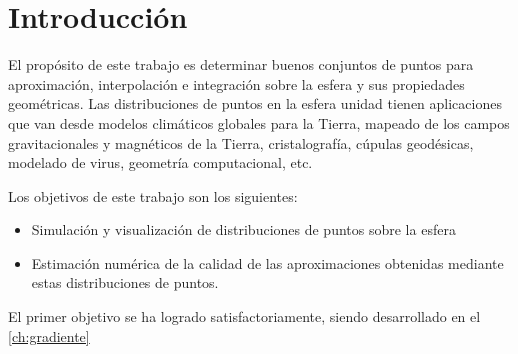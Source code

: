 \chapter{Introducción}
El propósito de este trabajo es determinar buenos conjuntos de puntos para aproximación, interpolación e integración sobre la esfera y sus propiedades geométricas. Las distribuciones de puntos en la esfera unidad tienen aplicaciones que van desde modelos climáticos globales para la  Tierra, mapeado de los campos gravitacionales y magnéticos de la Tierra, cristalografía, cúpulas geodésicas, modelado de virus, geometría computacional, etc. 

Los objetivos de este trabajo son los siguientes:
\begin{itemize}
	\item Simulación y visualización de distribuciones de puntos sobre la esfera
	\item Estimación numérica de la calidad de las aproximaciones obtenidas mediante estas distribuciones de puntos. 
\end{itemize}

El primer objetivo se ha logrado satisfactoriamente, siendo desarrollado en el \autoref{ch:gradiente}
